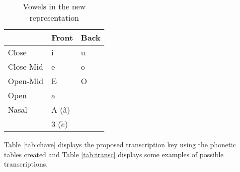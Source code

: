 \begin{center}
\begin{table}[H]
\begin{center}
    \begin{tabular}{lll}
        \hline
         & Front & Back \\
         \hline
        Close & i & u \\
        \hline
        Close-Mid & e & o \\
        \hline
        Open-Mid & E & O \\
        \hline
        Open & a &  \\
        \hline
        Nasal & A (ã) &\\ & 3 ($\tilde{e}$) &\\ 
        \hline
    \end{tabular}
\end{center}
\caption{Vowels in the new representation}
\label{tab:new_vocals}
\end{table}
\end{center}

  Table \ref{tab:chave} displays the proposed transcription key using the phonetic tables created and Table \ref{tab:transc} displays some examples of possible transcriptions.  

